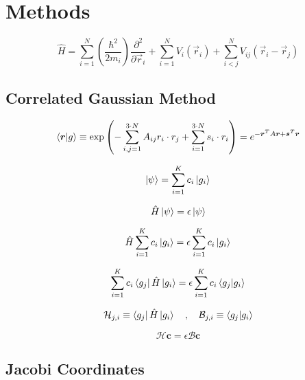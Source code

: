 \chapter{Methods}

\begin{equation}
\hat{H} = \sum_{i = 1}^{N} \left( \frac{\hbar ^2}{2 m_i} \right) \frac{\partial ^2}{\partial \vec{r}_i} + \sum_{i = 1}^{N} V_i (\vec{r}_i) + \sum_{i < j}^{N} V_{ij} (\vec{r}_i - \vec{r}_j)
\end{equation}



\section{Correlated Gaussian Method}

\begin{equation}
 \braket{ \boldsymbol{r} | g }  \equiv  \exp \left( - \sum_{i,j = 1}^{3 \cdot N} A_{ij} r_i \cdot r_j + \sum_{i=1}^{3 \cdot N} s_i \cdot r_i \right)  =  e^{-\boldsymbol{r}^T A \boldsymbol{r} + \boldsymbol{s}^T \boldsymbol{r} }
\end{equation}

\begin{equation}
	\ket{\psi} = \sum_{i = 1}^{K} c_i \ket{g_i}
\end{equation}

\begin{equation}
	\hat{H} \ket{\psi} = \epsilon \ket{\psi}
\end{equation}

\begin{equation}
	\hat{H} \sum_{i=1}^{K} c_{i} \ket{g_i} = \epsilon \sum_{i=1}^{K} c_{i} \ket{g_i} 
\end{equation}

\begin{equation}
	\sum_{i=1}^{K} c_{i} \bra{g_j} \hat{H} \ket{g_i} = \epsilon \sum_{i=1}^{K} c_{i} \braket{g_j | g_i} 
\end{equation}

\begin{equation}
	\mathcal{H}_{j,i} \equiv \bra{g_j} \hat{H} \ket{g_i} \quad , \quad \mathcal{B}_{j,i} \equiv \braket{g_j | g_i} 
\end{equation}

\begin{equation}
	\mathcal{H} \boldsymbol{c} = \epsilon \mathcal{B} \boldsymbol{c} 
\end{equation}

\section{Jacobi Coordinates}

